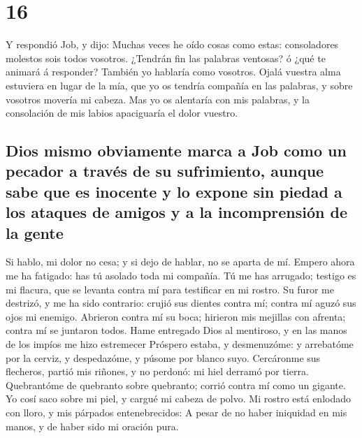 \hypertarget{section-18-16}{%
\section{16}\label{section-18-16}}

 Y respondió Job, y dijo:  Muchas veces he
oído cosas como estas: consoladores molestos sois todos vosotros.
 ¿Tendrán fin las palabras ventosas? ó ¿qué te animará á
responder?  También yo hablaría como vosotros. Ojalá
vuestra alma estuviera en lugar de la mía, que yo os tendría compañía en
las palabras, y sobre vosotros movería mi cabeza.  Mas yo
os alentaría con mis palabras, y la consolación de mis labios
apaciguaría el dolor vuestro.

\hypertarget{dios-mismo-obviamente-marca-a-job-como-un-pecador-a-travuxe9s-de-su-sufrimiento-aunque-sabe-que-es-inocente-y-lo-expone-sin-piedad-a-los-ataques-de-amigos-y-a-la-incomprensiuxf3n-de-la-gente}{%
\subsection{Dios mismo obviamente marca a Job como un pecador a través
de su sufrimiento, aunque sabe que es inocente y lo expone sin piedad a
los ataques de amigos y a la incomprensión de la
gente}\label{dios-mismo-obviamente-marca-a-job-como-un-pecador-a-travuxe9s-de-su-sufrimiento-aunque-sabe-que-es-inocente-y-lo-expone-sin-piedad-a-los-ataques-de-amigos-y-a-la-incomprensiuxf3n-de-la-gente}}

 Si hablo, mi dolor no cesa; y si dejo de hablar, no se
aparta de mí.  Empero ahora me ha fatigado: has tú asolado
toda mi compañía.  Tú me has arrugado; testigo es mi
flacura, que se levanta contra mí para testificar en mi rostro.
 Su furor me destrizó, y me ha sido contrario: crujió sus
dientes contra mí; contra mí aguzó sus ojos mi enemigo. 
Abrieron contra mí su boca; hirieron mis mejillas con afrenta; contra mí
se juntaron todos.  Hame entregado Dios al mentiroso, y
en las manos de los impíos me hizo estremecer  Próspero
estaba, y desmenuzóme: y arrebatóme por la cerviz, y despedazóme, y
púsome por blanco suyo.  Cercáronme sus flecheros, partió
mis riñones, y no perdonó: mi hiel derramó por tierra. 
Quebrantóme de quebranto sobre quebranto; corrió contra mí como un
gigante.  Yo cosí saco sobre mi piel, y cargué mi cabeza
de polvo.  Mi rostro está enlodado con lloro, y mis
párpados entenebrecidos:  A pesar de no haber iniquidad
en mis manos, y de haber sido mi oración pura.

